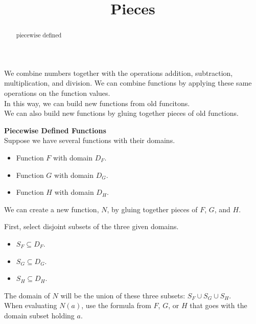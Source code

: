 \documentclass{ximera}
\title{Pieces}
\begin{document}
\begin{abstract}
piecewise defined
\end{abstract}
\maketitle



We combine numbers together with the operations addition, subtraction, multiplication, and division.  We can combine functions by applying these same operations on the function values.  \\

In this way, we can build new functions from old funcitons. \\

We can also build new functions by gluing together pieces of old functions.



\begin{template} \textbf{\textcolor{blue!55!black}{Piecewise Defined Functions}} \\


Suppose we have several functions with their domains.

\begin{itemize}
\item Function $F$ with domain $D_F$. 
\item Function $G$ with domain $D_G$. 
\item Function $H$ with domain $D_H$. 
\end{itemize}


We can create a new function, $N$, by gluing together pieces of $F$, $G$, and $H$.


First, select disjoint subsets of the three given domains.


\begin{itemize}
\item $S_F \subseteq D_F$. 
\item $S_G \subseteq D_G$. 
\item $S_H \subseteq D_H$. 
\end{itemize}


The domain of $N$ will be the union of these three subsets: $S_F \cup S_G \cup S_H$. \\

When evaluating $N(a)$, use the formula from $F$, $G$, or $H$ that goes with the domain subset holding $a$.


\end{template}
\end{document}
